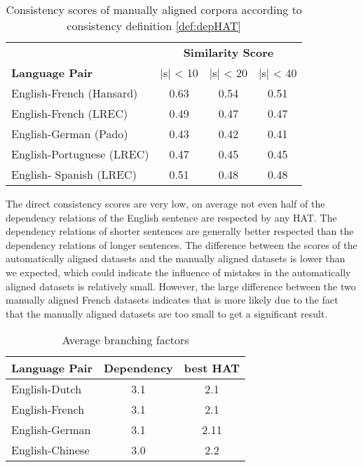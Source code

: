 \begin{table}[!ht]
\centering
\begin{tabular}{|l|c|c|c|}
\hline
&\multicolumn{3}{c|}{\textbf{Similarity Score}}\\
\textbf{Language Pair} & |s| < 10 & |s| < 20 & |s| < 40\\
\hline \hline
English-French (Hansard) & 0.63 & 0.54 & 0.51 \\
\hline
English-French (LREC) & 0.49 & 0.47 & 0.47 \\
\hline
English-German (Pado) & 0.43 & 0.42 & 0.41 \\
\hline
English-Portuguese (LREC) & 0.47 & 0.45 & 0.45 \\
\hline
English- Spanish (LREC) & 0.51 & 0.48 & 0.48\\
\hline
\end{tabular}
\caption{Consistency scores of manually aligned corpora according to consistency definition \ref{def:depHAT}}\label{tab:scores2}
\end{table}

The direct consistency scores are very low, on average not even half of the dependency relations of the English sentence are respected by any HAT. The dependency relations of shorter sentences are generally better respected than the dependency relations of longer sentences. The difference between the scores of the automatically aligned datasets and the manually aligned datasets is lower than we expected, which could indicate the influence of mistakes in the automatically aligned datasets is relatively small. However, the large difference between the two manually aligned French datasets indicates that is more likely due to the fact that the manually aligned datasets are too small to get a significant result.

\begin{table}[!ht]
\centering
\begin{tabular}{|l|c|c|}
\hline\textbf{Language Pair} & \textbf{Dependency} &\textbf{best HAT}\\
\hline \hline
English-Dutch & 3.1 & 2.1 \\
\hline
English-French & 3.1 & 2.1 \\
\hline
English-German & 3.1 & 2.11 \\
\hline
English-Chinese & 3.0 & 2.2\\
\hline
\end{tabular}
\caption{Average branching factors}\label{tab:branching}
\end{table}

